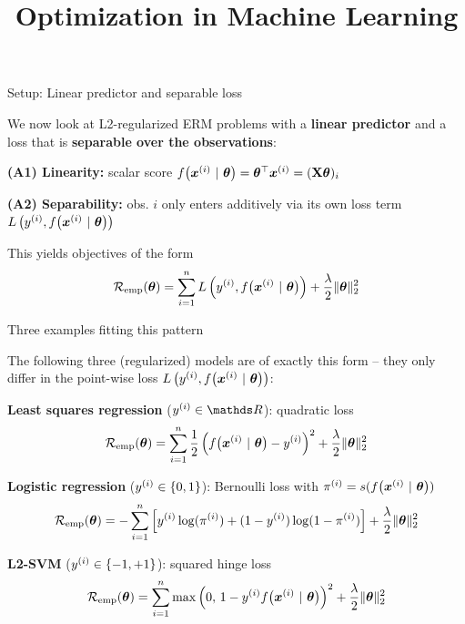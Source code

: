 \documentclass[11pt,compress,t,notes=noshow, xcolor=table]{beamer}
\title{Optimization in Machine Learning}
\begin{document}

\begin{framei}[sep=L]{Setup: Linear predictor and separable loss}
\item We now look at L2-regularized ERM problems with a \textbf{linear predictor} and a loss that is \textbf{separable over the observations}:
\begin{itemizeM}
\item \textbf{(A1) Linearity:} scalar score $f\big(\bm{x}^{(i)} ~|~ \bm{\theta}\big) = \bm{\theta}^\top \bm{x}^{(i)} = (\mathbf{X} \bm{\theta})_i$
\item \textbf{(A2) Separability:} obs. $i$ only enters additively via its own loss term $L\left(y^{(i)}, f\big(\bm{x}^{(i)} ~|~ \bm{\theta}\big)\right)$
\end{itemizeM}
\item This yields objectives of the form
$$
\mathcal{R}_{\text{emp}}(\bm{\theta}) = \sum\limits_{i=1}^n L\left(y^{(i)}, f\big(\bm{x}^{(i)} ~|~ \bm{\theta}\big)\right) + \frac{\lambda}{2}\|\bm{\theta}\|_2^2
$$
\end{framei}


\begin{framei}[fs=small]{Three examples fitting this pattern}
\item[] The following three (regularized) models are of exactly this form -- they only differ in the point-wise loss $L\left(y^{(i)}, f\big(\bm{x}^{(i)} ~|~ \bm{\theta}\big)\right)$:
\vfill
\item \textbf{Least squares regression} ($\yi \in \R$): quadratic loss
$$
\mathcal{R}_{\text{emp}}(\bm{\theta}) = \sum\limits_{i=1}^n \frac{1}{2} \left(f\big(\bm{x}^{(i)} ~|~ \bm{\theta}\big) - y^{(i)}\right)^2 + \frac{\lambda}{2}\|\bm{\theta}\|_2^2
$$
\item \textbf{Logistic regression} ($y^{(i)} \in \{0, 1\}$): Bernoulli loss with $\pi^{(i)} = s(f\big(\bm{x}^{(i)} ~|~ \bm{\theta}\big))$
$$
\mathcal{R}_{\text{emp}}(\bm{\theta}) = -\sum\limits_{i=1}^n \left[y^{(i)} \log(\pi^{(i)}) + (1 - y^{(i)}) \log(1 - \pi^{(i)})\right] + \frac{\lambda}{2}\|\bm{\theta}\|_2^2
$$
\item \textbf{L2-SVM} ($y^{(i)} \in \{-1, +1\}$): squared hinge loss
$$
\mathcal{R}_{\text{emp}}(\bm{\theta}) = \sum\limits_{i=1}^n \max\left(0,\, 1 - y^{(i)} f\big(\bm{x}^{(i)} ~|~ \bm{\theta}\big)\right)^2 + \frac{\lambda}{2}\|\bm{\theta}\|_2^2
$$
\end{framei}
\end{document}
